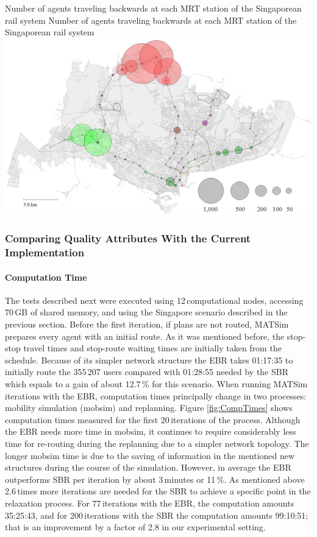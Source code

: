 \createfigure
{Number of agents traveling backwards at each MRT station of the Singaporean rail system}
{Number of agents traveling backwards at each MRT station of the Singaporean rail system}
{\label{fig:Backwards}}
{\includegraphics[width=1.0\textwidth]{extending/figures/ebr/Backwards.png}}
{}

\subsubsection{Comparing Quality Attributes With the Current Implementation}

\paragraph{Computation Time}

The tests described next were executed using 12\,computational nodes, accessing 70\,GB of shared memory, and using the Singapore scenario described in the previous section. Before the first iteration, if plans are not routed, MATSim prepares every agent with an initial route. As it was mentioned before, the stop-stop travel times and stop-route waiting times are initially taken from the schedule. Because of its simpler network structure the EBR takes 01:17:35 to initially route the 355\,207 users compared with 01:28:55 needed by the SBR which equals to a gain of about 12.7\,\% for this scenario. When running MATSim iterations with the EBR, computation times principally change in two processes: mobility simulation (mobsim) and replanning. Figure \ref{fig:CompTimes} shows computation times measured for the first 20\,iterations of the process. Although the EBR needs more time in mobsim, it continues to require considerably less time for re-routing during the replanning due to a simpler network topology. The longer mobsim time is due to the saving of information in the mentioned new structures during the course of the simulation. However, in average the EBR outperforms SBR per iteration by about 3\,minutes or 11\,\%. As mentioned above 2.6\,times more iterations are needed for the SBR to achieve a specific point in the relaxation process. For 77\,iterations with the EBR, the computation amounts 35:25:43, and for 200\,iterations with the SBR the computation amounts 99:10:51; that is an improvement by a factor of 2.8 in our experimental setting.

